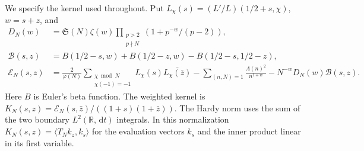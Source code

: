\documentclass[11pt,a4paper]{article}
\newcommand{\SSg}{\mathfrak S}
\newcommand{\dd}{\,\mathrm d}
\begin{document}
We specify the kernel used throughout. Put $L_\chi(s)=(L'/L)(1/2+s,\chi)$, $w=s+z$, and
\begin{align*}
 D_N(w)&=\SSg(N)\zeta(w)\prod_{\substack{p>2\\p\nmid N}}
                    (1+p^{-w}/(p-2)),\\
 \mathcal B(s,z)&=B(1/2-s,w)+B(1/2-z,w)-B(1/2-s,1/2-z),\\
 \mathcal E_N(s,z)&=\frac{2}{\varphi(N)}
       \sum_{\substack{\chi\bmod N\\\chi(-1)=-1}} L_\chi(s)\overline{L_\chi(\bar z)}
       -\sum_{(n,N)=1}\frac{\Lambda(n)^2}{n^{1+w}}-N^{-w}D_N(w)\mathcal B(s,z).
\end{align*}
Here $B$ is Euler's beta function. The weighted kernel is
$K_N(s,z)=\mathcal E_N(s,\bar z)/((1+s)(1+\bar z))$. The Hardy norm uses the sum of the two boundary $L^2(\mathbb R,\dd t)$ integrals. In this normalization $K_N(s,z)=\langle T_Nk_z,k_s\rangle$ for the evaluation vectors $k_s$ and the inner product linear in its first variable.
\end{document}
